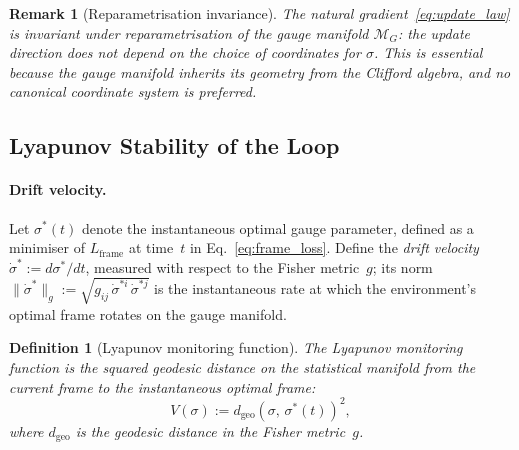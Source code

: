 \documentclass[12pt]{article}
\newtheorem{definition}[theorem]{Definition}
\newtheorem{remark}[theorem]{Remark}
\begin{document}
\begin{remark}[Reparametrisation invariance]
\label{rem:reparam}
The natural gradient~\eqref{eq:update_law} is invariant
under reparametrisation of the gauge manifold
$\mathcal{M}_G$: the update direction does not depend on the
choice of coordinates for $\sigma$.
This is essential because the gauge manifold inherits its
geometry from the Clifford algebra, and no canonical
coordinate system is preferred.
\end{remark}

\subsection{Lyapunov Stability of the Loop}
\label{subsec:lyapunov}

\paragraph{Drift velocity.}
Let $\sigma^*(t)$ denote the instantaneous optimal gauge
parameter, defined as a minimiser of $L_{\mathrm{frame}}$
at time~$t$ in Eq.~\eqref{eq:frame_loss}.
Define the \emph{drift velocity}
$\dot{\sigma}^* := d\sigma^*/dt$, measured with respect to
the Fisher metric~$g$; its norm
$\|\dot{\sigma}^*\|_g
:= \sqrt{g_{ij}\,\dot{\sigma}^{*i}\,\dot{\sigma}^{*j}}$
is the instantaneous rate at which the environment's
optimal frame rotates on the gauge manifold.

\begin{definition}[Lyapunov monitoring function]
\label{def:lyapunov}
The \emph{Lyapunov monitoring function} is the squared
geodesic distance on the statistical manifold from the
current frame to the instantaneous optimal frame:
\begin{equation}
\label{eq:lyapunov}
V(\sigma)
:= d_{\mathrm{geo}}\!\left(\sigma,\,\sigma^*(t)\right)^2,
\end{equation}
where $d_{\mathrm{geo}}$ is the geodesic distance in the
Fisher metric~$g$.
\end{definition}
\end{document}
